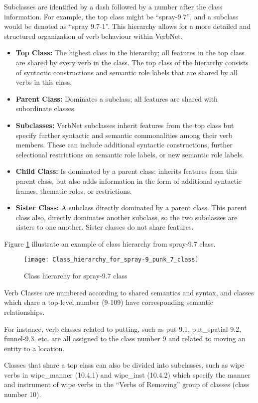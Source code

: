 Subclasses are identified by a dash followed by a number after the class information. For example, the top class might be \enquote{spray-9.7}, and a subclass would be denoted as \enquote{spray 9.7-1}. This hierarchy allows for a more detailed and structured organization of verb behaviour within VerbNet. 
\begin{itemize}
\item \textbf{Top Class:} The highest class in the hierarchy; all features in the top class are shared by every verb in the class. The top class of the hierarchy consists of syntactic constructions and semantic role labels that are shared by all verbs in this class.
\item \textbf{Parent Class:} Dominates a subclass; all features are shared with subordinate classes.
\item \textbf{Subclasses:} VerbNet subclasses inherit features from the top class but specify further syntactic and semantic commonalities among their verb members. These can include additional syntactic constructions, further selectional restrictions on semantic role labels, or new semantic role labels.
\item \textbf{Child Class:} Is dominated by a parent class; inherits features from this parent class, but also adds information in the form of additional syntactic frames, thematic roles, or restrictions. 
\item \textbf{Sister Class:} A subclass directly dominated by a parent class. This parent class also, directly dominates another subclass, so the two subclasses are sisters to one another. Sister classes do not share features.
\end{itemize}
Figure \ref{fig:hierachy_class} illustrate an example of class hierarchy from spray-9.7 class.
\begin{figure}
\center
\texttt{[image: Class\_hierarchy\_for\_spray-9\_punk\_7\_class]}
\caption{Class hierarchy for spray-9.7 class \cite{heck2014quality}}\label{fig:hierachy_class}
\end{figure}
Verb Classes are numbered according to shared semantics and syntax, and classes which share a top-level number (9-109) have corresponding semantic relationships. 

For instance, verb classes related to putting, such as put-9.1, put\_spatial-9.2, funnel-9.3, etc. are all assigned to the class number 9 and related to moving an entity to a location. 

Classes that share a top class can also be divided into subclasses, such as wipe verbs in wipe\_manner (10.4.1) and wipe\_inst (10.4.2) which specify the manner and instrument of wipe verbs in the \enquote{Verbs of Removing} group of classes (class number 10). 

